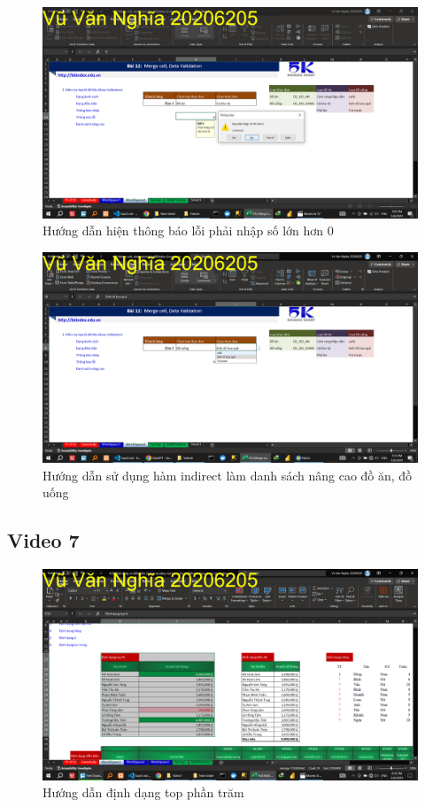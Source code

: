 \documentclass{article}
\begin{document}
\begin{figure}[H]
\centering
\includegraphics[scale = 0.15]{Video6/HuongDan/3.png}
\caption{Hướng dẫn hiện thông báo lỗi phải nhập số lớn hơn 0}
\end{figure}

\begin{figure}[H]
\centering
\includegraphics[scale = 0.15]{Video6/HuongDan/4.png}
\caption{Hướng dẫn sử dụng hàm indirect làm danh sách nâng cao đồ ăn, đồ uống}
\end{figure}
\subsection{Video 7}
\begin{figure}[H]
\centering
\includegraphics[scale = 0.15]{Video7/HuongDan/0.png}
\caption{Hướng dẫn định dạng top phần trăm}
\end{figure}
\end{document}
